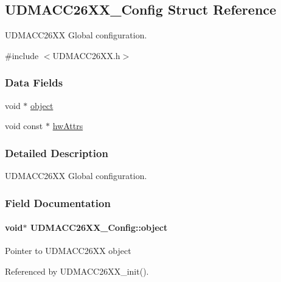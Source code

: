 \subsection{U\+D\+M\+A\+C\+C26\+X\+X\+\_\+\+Config Struct Reference}
\label{struct_u_d_m_a_c_c26_x_x___config}


U\+D\+M\+A\+C\+C26\+X\+X Global configuration.  




{\ttfamily \#include $<$U\+D\+M\+A\+C\+C26\+X\+X.\+h$>$}

\subsubsection*{Data Fields}
\begin{DoxyCompactItemize}
\item 
void $\ast$ \hyperlink{struct_u_d_m_a_c_c26_x_x___config_a9b87747e67e7cba15e71ccdd495bbf65}{object}
\item 
void const $\ast$ \hyperlink{struct_u_d_m_a_c_c26_x_x___config_a394867c60268267c4c503fb10100d960}{hw\+Attrs}
\end{DoxyCompactItemize}


\subsubsection{Detailed Description}
U\+D\+M\+A\+C\+C26\+X\+X Global configuration. 

\subsubsection{Field Documentation}
\paragraph[{object}]{\setlength{\rightskip}{0pt plus 5cm}void$\ast$ U\+D\+M\+A\+C\+C26\+X\+X\+\_\+\+Config\+::object}\label{struct_u_d_m_a_c_c26_x_x___config_a9b87747e67e7cba15e71ccdd495bbf65}
Pointer to U\+D\+M\+A\+C\+C26\+X\+X object 

Referenced by U\+D\+M\+A\+C\+C26\+X\+X\+\_\+init().


